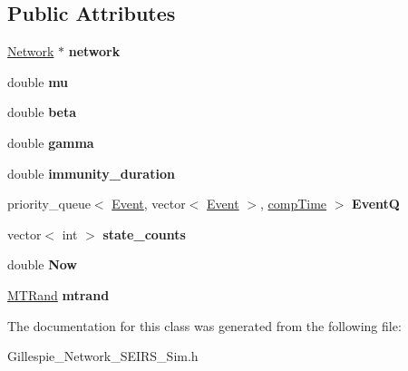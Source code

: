 \subsection*{Public Attributes}
\begin{DoxyCompactItemize}
\item 
\hypertarget{classGillespie__Network__SEIRS__Sim_a3193fb9bf6b3dd896d72bdfcf04e4d42}{}\hyperlink{classNetwork}{Network} $\ast$ {\bfseries network}\label{classGillespie__Network__SEIRS__Sim_a3193fb9bf6b3dd896d72bdfcf04e4d42}

\item 
\hypertarget{classGillespie__Network__SEIRS__Sim_a04a4ebce166d5fe4db9b0682c4be6dcd}{}double {\bfseries mu}\label{classGillespie__Network__SEIRS__Sim_a04a4ebce166d5fe4db9b0682c4be6dcd}

\item 
\hypertarget{classGillespie__Network__SEIRS__Sim_a44df052180f79b45b03bc2e62235223e}{}double {\bfseries beta}\label{classGillespie__Network__SEIRS__Sim_a44df052180f79b45b03bc2e62235223e}

\item 
\hypertarget{classGillespie__Network__SEIRS__Sim_ae82ddeca49ef108857160ada93e2ec0a}{}double {\bfseries gamma}\label{classGillespie__Network__SEIRS__Sim_ae82ddeca49ef108857160ada93e2ec0a}

\item 
\hypertarget{classGillespie__Network__SEIRS__Sim_a24c4c1e7175470953a16b31094cbf732}{}double {\bfseries immunity\+\_\+duration}\label{classGillespie__Network__SEIRS__Sim_a24c4c1e7175470953a16b31094cbf732}

\item 
\hypertarget{classGillespie__Network__SEIRS__Sim_a15c255bee7c7ca340cf87df69f2566c4}{}priority\+\_\+queue$<$ \hyperlink{classEvent}{Event}, vector$<$ \hyperlink{classEvent}{Event} $>$, \hyperlink{classcompTime}{comp\+Time} $>$ {\bfseries Event\+Q}\label{classGillespie__Network__SEIRS__Sim_a15c255bee7c7ca340cf87df69f2566c4}

\item 
\hypertarget{classGillespie__Network__SEIRS__Sim_a8517dadca41d398109c7750fd9235570}{}vector$<$ int $>$ {\bfseries state\+\_\+counts}\label{classGillespie__Network__SEIRS__Sim_a8517dadca41d398109c7750fd9235570}

\item 
\hypertarget{classGillespie__Network__SEIRS__Sim_a919dd648216a95ded448aa21afda9b39}{}double {\bfseries Now}\label{classGillespie__Network__SEIRS__Sim_a919dd648216a95ded448aa21afda9b39}

\item 
\hypertarget{classGillespie__Network__SEIRS__Sim_a62f25b5c1c5a66b983f62c37f4bd0753}{}\hyperlink{classMTRand}{M\+T\+Rand} {\bfseries mtrand}\label{classGillespie__Network__SEIRS__Sim_a62f25b5c1c5a66b983f62c37f4bd0753}

\end{DoxyCompactItemize}


The documentation for this class was generated from the following file\+:\begin{DoxyCompactItemize}
\item 
Gillespie\+\_\+\+Network\+\_\+\+S\+E\+I\+R\+S\+\_\+\+Sim.\+h\end{DoxyCompactItemize}
